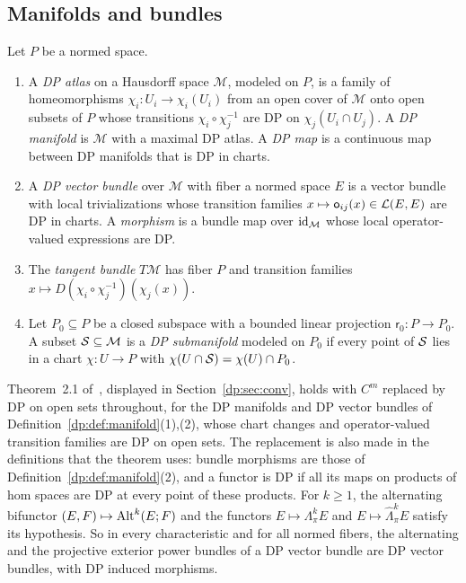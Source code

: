\subsection{Manifolds and bundles}\label{dp:ssec:bundles}

\begin{definition}\label{dp:def:manifold}
Let $P$ be a normed space.
\begin{enumerate}
\item A \emph{DP atlas} on a Hausdorff space $\mathcal M$, modeled on $P$, is a family of homeomorphisms $\chi_i\colon U_i\to\chi_i(U_i)$ from an open cover of $\mathcal M$ onto open subsets of $P$ whose transitions $\chi_i\circ\chi_j^{-1}$ are DP on $\chi_j(U_i\cap U_j)$. A \emph{DP manifold} is $\mathcal M$ with a maximal DP atlas. A \emph{DP map} is a continuous map between DP manifolds that is DP in charts.
\item A \emph{DP vector bundle} over $\mathcal M$ with fiber a normed space $E$ is a vector bundle with local trivializations whose transition families $x\mapsto\mathsf o_{ij}(x)\in\mathcal L(E,E)$ are DP in charts. A \emph{morphism} is a bundle map over $\mathrm{id}_{\mathcal M}$ whose local operator-valued expressions are DP.
\item The \emph{tangent bundle} $T\mathcal M$ has fiber $P$ and transition families $x\mapsto D(\chi_i\circ\chi_j^{-1})(\chi_j(x))$.
\item Let $P_0\subseteq P$ be a closed subspace with a bounded linear projection $\mathsf r_0\colon P\to P_0$. A subset $\mathcal S\subseteq\mathcal M$ is a \emph{DP submanifold} modeled on $P_0$ if every point of $\mathcal S$ lies in a chart $\chi\colon U\to P$ with $\chi(U\cap\mathcal S)=\chi(U)\cap P_0$.
\end{enumerate}
\end{definition}

\begin{corollary}\label{dp:cor:bundles}
Theorem~2.1 of~\cite{I}, displayed in Section~\ref{dp:sec:conv}, holds with $C^m$ replaced by DP on open sets throughout, for the DP manifolds and DP vector bundles of Definition~\ref{dp:def:manifold}(1),(2), whose chart changes and operator-valued transition families are DP on open sets. The replacement is also made in the definitions that the theorem uses: bundle morphisms are those of Definition~\ref{dp:def:manifold}(2), and a functor is DP if all its maps on products of hom spaces are DP at every point of these products. For $k\ge1$, the alternating bifunctor $(E,F)\mapsto\operatorname{Alt}^k(E;F)$ and the functors $E\mapsto\Lambda^k_\pi E$ and $E\mapsto\widehat\Lambda^k_\pi E$ satisfy its hypothesis. So in every characteristic and for all normed fibers, the alternating and the projective exterior power bundles of a DP vector bundle are DP vector bundles, with DP induced morphisms.
\end{corollary}

